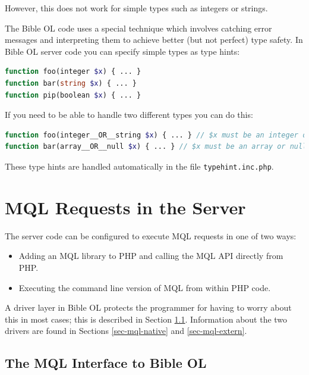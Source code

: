 \documentclass[11pt,oneside,a4paper]{memoir}
\begin{document}
However, this does not work for simple types such as integers or strings.

The Bible OL code uses a special technique which involves catching error messages and interpreting them
to achieve better (but not perfect) type safety. In Bible OL server code you can specify simple types as type hints:

\begin{lstlisting}[language=PHP]
function foo(integer $x) { ... }
function bar(string $x) { ... }
function pip(boolean $x) { ... }
\end{lstlisting}

If you need to be able to handle two different types you can do this:

\begin{lstlisting}[language=PHP]
function foo(integer__OR__string $x) { ... } // $x must be an integer or a string
function bar(array__OR__null $x) { ... } // $x must be an array or null
\end{lstlisting}

These type hints are handled automatically in the file \texttt{typehint.inc.php}.



\section{MQL Requests in the Server}\label{sec-mql-server}

The server code can be configured to execute MQL requests in one of two ways:

\begin{itemize}
\item Adding an MQL library to PHP and calling the MQL API directly from PHP.
\item Executing the command line version of MQL from within PHP code.
\end{itemize}

A driver layer in Bible OL protects the programmer for having to worry about this in most cases;
this is described in Section \ref{sec-mql-if}. Information about the two drivers are found in Sections
\ref{sec-mql-native} and \ref{sec-mql-extern}.


\subsection{The MQL Interface to Bible OL}\label{sec-mql-if}
\end{document}
